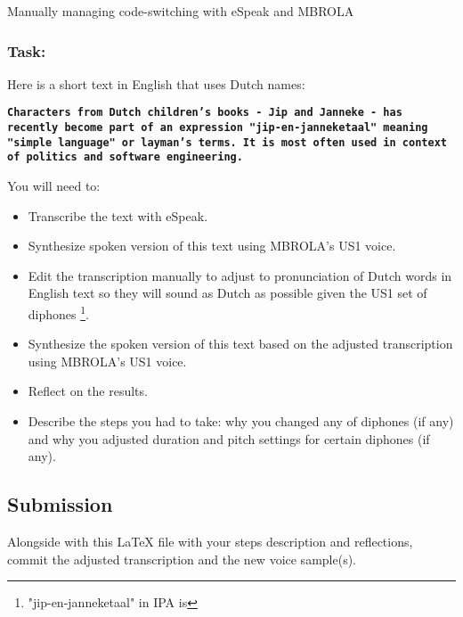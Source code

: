 \documentclass{../labbook}
\begin{document}
\begin{problem}{2}{7}{Manually managing code-switching with eSpeak and MBROLA}
\subsubsection*{Task:}
\noindent Here is a short text in English that uses Dutch names: 

\textbf{\texttt{Characters from Dutch children's books - Jip and Janneke - has recently become part of an expression "jip-en-janneketaal" meaning "simple language" or layman's terms. It is most often used in context of politics and software engineering.}}
\smallskip

You will need to:
\begin{itemize}
    \item Transcribe the text with eSpeak.
    \item Synthesize spoken version of this text using MBROLA's US1 voice.
    \item Edit the transcription manually to adjust to pronunciation of Dutch words in English text so they will sound as Dutch as possible given the US1 set of diphones \footnote{"jip-en-janneketaal" in IPA is }.
    \item Synthesize the spoken version of this text based on the adjusted transcription using MBROLA's US1 voice.
    \item Reflect on the results.
    \item Describe the steps you had to take: why you changed any of diphones (if any) and why you adjusted duration and pitch settings for certain diphones (if any). 
\end{itemize}
\subsection*{Submission}
\noindent Alongside with this LaTeX file with your steps description and reflections, commit the adjusted transcription and the new voice sample(s).
\end{problem}
\end{document}
